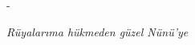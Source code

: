 
\calccentering{\unitlength}
\begin{dedication}
  \begin{adjustwidth*}{\unitlength}{-\unitlength}
    \begin{adjustwidth}{-1cm}{-1cm}
      \hspace{4cm}
      \emph{Rüyalarıma hükmeden güzel Nünü'ye}
    \end{adjustwidth}
  \end{adjustwidth*}
\end{dedication}
